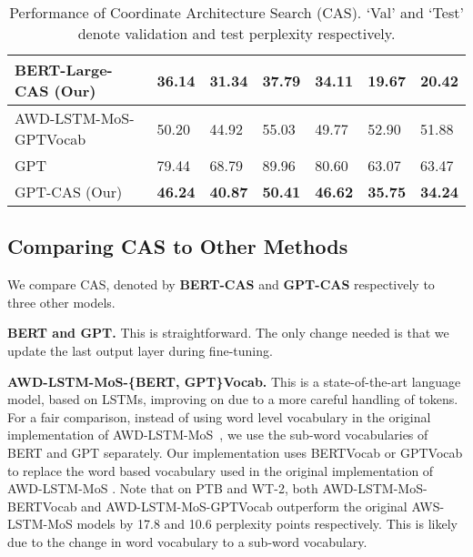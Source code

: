 \documentclass[11pt,a4paper]{article}
\begin{document}
\begin{table*}[t!]
\begin{tabular}{|l|l|l|l|l|l|l|}
BERT-Large-CAS (Our)                          & \textbf{36.14}                    & \textbf{31.34}                     & \textbf{37.79}                    & \textbf{34.11}                     & \textbf{19.67}                    & \textbf{20.42}                     \\ \hline
\hline
AWD-LSTM-MoS-GPTVocab                                 & 50.20                             & 44.92                              & 55.03                             & 49.77                              & 52.90                             & 51.88                              \\ \hline
GPT                                       & 79.44                             & 68.79                              & 89.96                             & 80.60                              & 63.07                             & 63.47                              \\ \hline
GPT-CAS (Our)                           & \textbf{46.24}                    & \textbf{40.87}                     & \textbf{50.41}                    & \textbf{46.62}                     & \textbf{35.75}                    & \textbf{34.24}                         \\ \hline
\end{tabular}
\caption{Performance of Coordinate Architecture Search (CAS). `Val' and `Test' denote validation and test perplexity respectively.}
\label{tab:result}
\end{table*}

\subsection{Comparing CAS to Other Methods}

We compare CAS, denoted by \textbf{BERT-CAS} and \textbf{GPT-CAS} respectively to three other models. 

{\bfseries BERT and GPT.} This is straightforward. The only change needed is that we update the last output layer during fine-tuning. 

{\bfseries AWD-LSTM-MoS-\{BERT, GPT\}Vocab.}  This is a state-of-the-art
language model, based on LSTMs, improving on \cite{Yang03953} due to a
more careful handling of tokens. For a fair comparison, instead of using word level vocabulary in the original implementation of AWD-LSTM-MoS~\cite{Yang03953}, we use the sub-word vocabularies of BERT and GPT separately. Our implementation uses
BERTVocab or GPTVocab to replace the word based vocabulary used in
the original implementation of AWD-LSTM-MoS \cite{Yang03953}. Note
that on PTB and WT-2, both AWD-LSTM-MoS-BERTVocab and
AWD-LSTM-MoS-GPTVocab outperform the original AWS-LSTM-MoS models by
17.8 and 10.6 perplexity points respectively. This is likely due to
the change in word vocabulary to a sub-word vocabulary.
\end{document}
